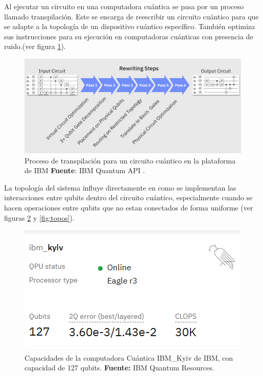 \documentclass[letterpaper,12pt]{thesisECFM}
\theoremstyle{plain}
\theoremstyle{definition}
\theoremstyle{definition}
\theoremstyle{remark}
\newcommand{\1}{\mathbb{1}}
\begin{document}
Al ejecutar un circuito en una computadora cuántica se pasa por un proceso llamado transpilación. Este se encarga de reescribir un circuito cuántico para que se adapte a la topología de un dispositivo cuántico específico. También optimiza sus instrucciones para su ejecución en computadoras cuánticas con presencia de ruido.(ver figura \ref{fig:transpiling}). 
\begin{figure}[h]
    \centering
    \includegraphics[scale=0.20]{imagenes/transpiling_core_steps.png}
    \caption{Proceso de transpilación para un circuito cuántico en la plataforma de IBM \textbf{Fuente}: IBM Quantum API \cite{qiskit_transpiler}.}
    \label{fig:transpiling}
\end{figure}
La topología del sistema influye directamente en como se implementan las interacciones entre qubits dentro del circuito cuántico, especialmente cuando se hacen operaciones entre qubits que no estan conectados de forma uniforme (ver figuras \ref{fig:topos_kyiv} y  \ref{fig:topos}). 

\begin{figure}[h]
    \centering
    \includegraphics[scale=0.7]{imagenes/ibm_kyiv_front.png}
    \caption{Capacidades de la computadora Cuántica IBM\_Kyiv de IBM, con capacidad de 127 qubits. \textbf{Fuente:} IBM Quantum Resources. \cite{ibm_quantum_resources}}
    \label{fig:topos_kyiv}
\end{figure}
\end{document}
